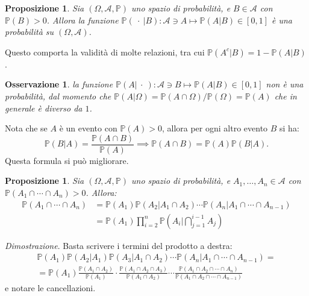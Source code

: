 \documentclass[11pt]{book}
\makeatletter
\theoremstyle{Definizione}
\theoremstyle{TeoremaProposizioneLemmaCorollario}
\newtheorem{mypropo}[myteo]{Proposizione}
\theoremstyle{OsservazioneNota}
\newtheorem{myobs}{Osservazione}[section]
\renewenvironment{proof}[1][\proofname]{\par
  \normalfont \topsep6\p@\@plus6\p@\relax
  \trivlist
  \item[\hskip\labelsep
        \itshape
    #1\@addpunct{.}]\ignorespaces
}{%
  \endtrivlist\@endpefalse
}
\renewcommand{\P}{\mathbb{P}}
\renewenvironment{proof}{\textsl{Dimostrazione}.}{}
\makeatother
\begin{document}
\begin{boxpro}
\begin{mypropo}
Sia $(\Omega,\mathcal{A},\P)$ uno spazio di probabilità, e $B\in \mathcal{A}$ con $\P(B) > 0$. Allora la funzione $\P(\ \cdot\ |B): \mathcal{A}\ni A \longmapsto \P(A|B)\in [0,1]$ è una probabilità su $(\Omega,\mathcal{A})$.
\end{mypropo}
\end{boxpro}
Questo comporta la validità di molte relazioni, tra cui $\P(A^c|B) = 1-\P(A|B)$.
\begin{myobs}
la funzione $\P(A|\ \cdot\ ):\mathcal{A}\ni B \longmapsto \P(A|B)\in [0,1]$ non è una probabilità, dal momento che $\P(A|\Omega) = \P(A\cap \Omega) /\P(\Omega) = \P(A)$ che in generale è diverso da $1$.
\end{myobs}
Nota che se $A$ è un evento con $\P(A) > 0$, allora per ogni altro evento $B$ si ha:
$$
\P(B|A) = \frac{\P(A\cap B)}{\P(A)} \implies \P(A\cap B) = \P(A)\P(B|A).
$$
Questa formula si può migliorare.
\begin{boxpro}
\begin{mypropo}
Sia $(\Omega,\mathcal{A},\P)$ uno spazio di probabilità, e $A_1,\dots,A_n\in \mathcal{A}$ con $\P(A_1\cap \cdots \cap A_n) > 0$. Allora:
\begin{align*}
\P(A_1\cap \cdots \cap A_n) &= \P(A_1) \P(A_2|A_1\cap A_2) \cdots \P(A_n |A_1\cap \cdots \cap A_{n-1})\\
&= \P(A_1) \prod_{i = 2}^n \P\left(A_i \Bigg| \bigcap_{j = 1}^{i-1} A_j\right)
\end{align*}
\end{mypropo}
\tcblower
\begin{proof}
Basta scrivere i termini del prodotto a destra:
\begin{multline*}
\P(A_1) \P(A_2|A_1)\P(A_3| A_1\cap A_2) \cdots \P(A_n |A_1\cap \cdots \cap A_{n-1}) = \\
= \P(A_1) \frac{\P(A_1\cap A_2) }{\P(A_1)} \cdot \frac{\P(A_1\cap A_2 \cap A_3)}{\P(A_1\cap A_2)}\cdots \frac{\P(A_1\cap A_2 \cap \cdots \cap A_n)}{\P(A_1\cap A_2 \cap \cdots \cap A_{n-1})}
\end{multline*}
e notare le cancellazioni.
\end{proof}
\end{boxpro}
\end{document}
